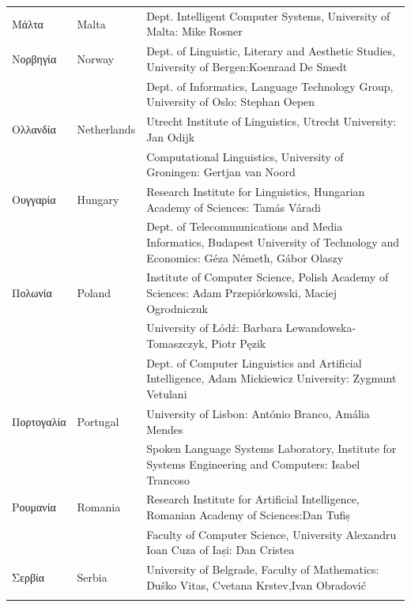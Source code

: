 \begin{longtable}{@{}llp{113mm}@{}}
  Μάλτα & \textcolor{grey1}{Malta} & Dept. Intelligent Computer Systems, University of Malta: Mike Rosner\\ \addlinespace
  Νορβηγία & \textcolor{grey1}{Norway} & Dept. of Linguistic, Literary and Aesthetic Studies, University of Bergen:\newline Koenraad De Smedt\\ \addlinespace 
  & & Dept. of Informatics, Language Technology Group, University of Oslo: Stephan Oepen \\ \addlinespace
  Ολλανδία & \textcolor{grey1}{Netherlands} & Utrecht Institute of Linguistics, Utrecht University: Jan Odijk\\ \addlinespace 
  & & Computational Linguistics, University of Groningen: Gertjan van Noord\\ \addlinespace
  Ουγγαρία & \textcolor{grey1}{Hungary} & Research Institute for Linguistics, Hungarian Academy of Sciences: Tamás Váradi\\  \addlinespace
  & & Dept. of Telecommunications and Media Informatics, Budapest University of Technology and Economics: Géza Németh, Gábor Olaszy\\ \addlinespace
  Πολωνία & \textcolor{grey1}{Poland} & Institute of Computer Science, Polish Academy of Sciences: Adam Przepiórkowski, Maciej Ogrodniczuk \\ \addlinespace
  & & University of Łódź: Barbara Lewandowska-Tomaszczyk, Piotr Pęzik\\ \addlinespace
  & & Dept. of Computer Linguistics and Artificial Intelligence, Adam Mickiewicz University: Zygmunt Vetulani \\ \addlinespace
  Πορτογαλία & \textcolor{grey1}{Portugal} & University of Lisbon: António Branco, Amália Mendes \\ \addlinespace
  & & Spoken Language Systems Laboratory, Institute for Systems Engineering and Computers: Isabel Trancoso \\ \addlinespace
  Ρουμανία & \textcolor{grey1}{Romania} & Research Institute for Artificial Intelligence, Romanian Academy of Sciences:\newline Dan Tufiș \\ \addlinespace
  & & Faculty of Computer Science, University Alexandru Ioan Cuza of Iași: Dan Cristea \\ \addlinespace
  Σερβία & \textcolor{grey1}{Serbia} & University of Belgrade, Faculty of Mathematics: Duško Vitas, Cvetana Krstev,\newline Ivan Obradović \\ \addlinespace

\end{longtable}
